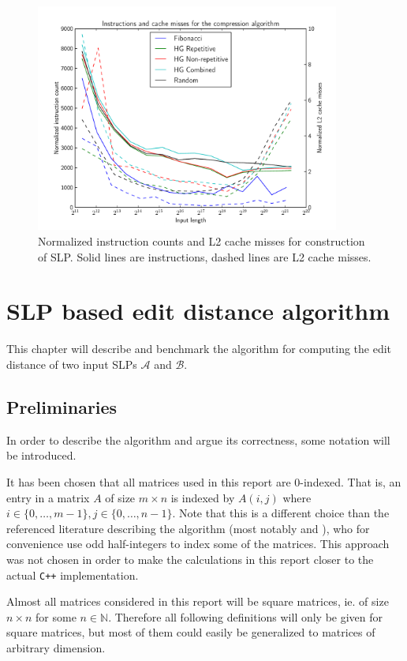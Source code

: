 \documentclass[twoside,11pt,openright]{report}
\newcommand{\SLP}[1] {\mathcal{#1}}
\begin{document}
\begin{figure}[htb]
  \centering
  \includegraphics[width=10cm]{compression/instructions}
  \caption{Normalized instruction counts and L2 cache misses for construction of SLP. Solid lines are instructions, dashed lines are L2 cache misses.}
  \label{fig:compression:instructions}
\end{figure}

\chapter{SLP based edit distance algorithm}
\label{ch:algorithm}

This chapter will describe and benchmark the algorithm for computing the edit distance of two input SLPs $\SLP{A}$ and $\SLP{B}$.

\section{Preliminaries}
\label{sec:algorithm:preliminaries}
In order to describe the algorithm and argue its correctness, some notation will be introduced.

It has been chosen that all matrices used in this report are $0$-indexed. That is, an entry in a matrix $A$ of size $m \times n$ is indexed by $A(i, j)$ where $i \in \{0, \dots, m - 1\}, j \in \{0, \dots, n - 1\}$. Note that this is a different choice than the referenced literature describing the algorithm (most notably \cite{Tiskin:2010:FDM:1873601.1873704} and \cite{DBLP:journals/corr/abs-0707-3619}), who for convenience use odd half-integers to index some of the matrices. This approach was not chosen in order to make the calculations in this report closer to the actual \texttt{C++} implementation.

Almost all matrices considered in this report will be square matrices, ie. of size $n \times n$ for some $n \in \mathbb{N}$. Therefore all following definitions will only be given for square matrices, but most of them could easily be generalized to matrices of arbitrary dimension.
\end{document}
